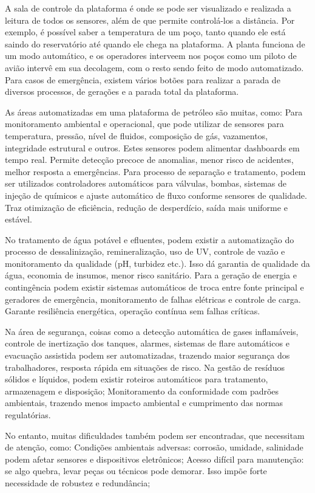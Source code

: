 \documentclass{article}
\begin{document}
A sala de controle da plataforma é onde se pode ser visualizado e realizada a leitura de todos os sensores, além de que permite controlá-los a distância. Por exemplo, é possível saber a temperatura de um poço, tanto quando ele está saindo do reservatório até quando ele chega na plataforma. A planta funciona de um modo automático, e os operadores interveem nos poços como um piloto de avião intervê em sua decolagem, com o resto sendo feito de modo automatizado. Para casos de emergência, existem vários botões para realizar a parada de diversos processos, de gerações e a parada total da plataforma. 

As áreas automatizadas em uma plataforma de petróleo são muitas, como: Para monitoramento ambiental e operacional, que pode utilizar de sensores para temperatura, pressão, nível de fluidos, composição de gás, vazamentos, integridade estrutural e outros. Estes sensores podem alimentar dashboards em tempo real. Permite detecção precoce de anomalias, menor risco de acidentes, melhor resposta a emergências. Para processo de separação e tratamento, podem ser utilizados 
controladores automáticos para válvulas, bombas, sistemas de injeção de químicos e ajuste automático de fluxo conforme sensores de qualidade. Traz otimização de eficiência, redução de desperdício, saída mais uniforme e estável.  

No tratamento de água potável e efluentes, podem existir a automatização do processo de dessalinização, remineralização, uso de UV, controle de vazão e monitoramento da qualidade (pH, turbidez etc.). Isso dá garantia de qualidade da água, economia de insumos, menor risco sanitário. Para a geração de energia e contingência	 podem existir sistemas automáticos de troca entre fonte principal e geradores de emergência, monitoramento de falhas elétricas e controle de carga. Garante resiliência energética, operação contínua sem falhas críticas. 

Na área de segurança, coisas como a detecção automática de gases inflamáveis, controle de inertização dos tanques, alarmes, sistemas de flare automáticos e evacuação assistida podem ser automatizadas, trazendo maior segurança dos trabalhadores, resposta rápida em situações de risco.  Na gestão de resíduos sólidos e líquidos, podem existir roteiros automáticos para tratamento, armazenagem e disposição; Monitoramento da conformidade com padrões ambientais, trazendo menos impacto ambiental e cumprimento das normas regulatórias.  

No entanto, muitas dificuldades também podem ser encontradas, que necessitam de atenção, como: Condições ambientais adversas: corrosão, umidade, salinidade podem afetar sensores e dispositivos eletrônicos; Acesso difícil para manutenção: se algo quebra, levar peças ou técnicos pode demorar. Isso impõe forte necessidade de robustez e redundância;  
\end{document}
